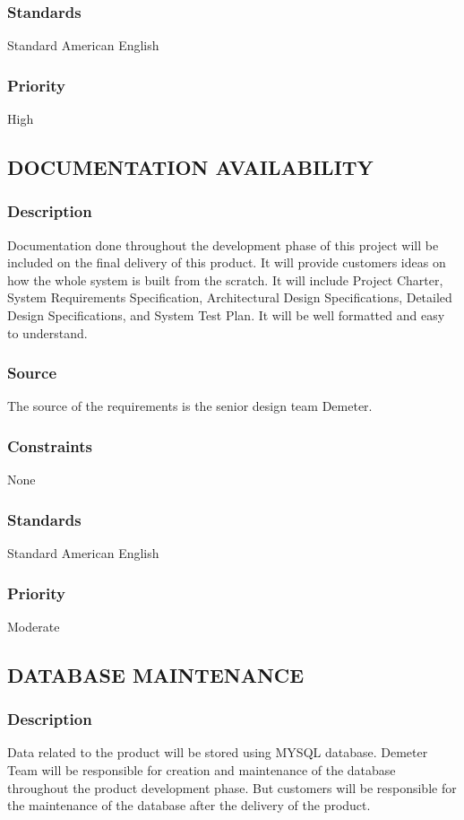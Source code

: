 \subsubsection{Standards}
Standard American English
\subsubsection{Priority}
High

\subsection{DOCUMENTATION AVAILABILITY}
\subsubsection{Description}
Documentation done throughout the development phase of this project will be included on the final delivery of this product. It will provide customers ideas on how the whole system is built from the scratch. It will include Project Charter, System Requirements Specification, Architectural Design Specifications, Detailed Design Specifications, and System Test Plan. It will be well formatted and easy to understand.
\subsubsection{Source}
The source of the requirements is the senior design team Demeter.
\subsubsection{Constraints}
None
\subsubsection{Standards}
Standard American English
\subsubsection{Priority}
Moderate

\subsection{DATABASE MAINTENANCE}
\subsubsection{Description}
Data related to the product will be stored using MYSQL database. Demeter Team will be responsible for creation and maintenance of the database throughout the product development phase. But customers will be responsible for the maintenance of the database after the delivery of the product.
